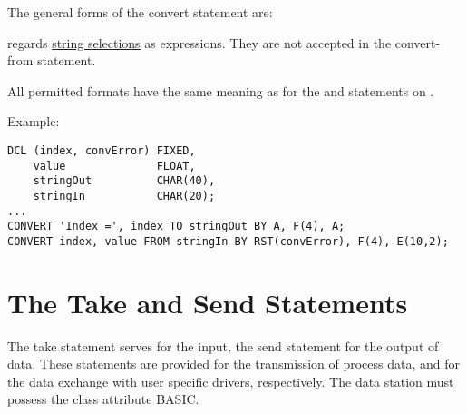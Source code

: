 The general forms of the convert statement are:

\begin{grammarframe}





\end{grammarframe}

\OpenPEARL{} regards \hyperlink{StringSelection}{string selections} as
expressions. They are not accepted in the convert-from statement.

All permitted formats have the same meaning as for the  and 
statements 
on  .

Example:

\begin{lstlisting}
DCL (index, convError) FIXED,
    value              FLOAT,
    stringOut          CHAR(40),
    stringIn           CHAR(20);
...
CONVERT 'Index =', index TO stringOut BY A, F(4), A;
CONVERT index, value FROM stringIn BY RST(convError), F(4), E(10,2);
\end{lstlisting}

\section{The Take and Send Statements}    %
\label{sec_take_send}

The take statement serves for the input, the send statement for the
output of data. These statements are provided for the transmission of
process data, and for the data exchange with user specific drivers,
respectively. The data station must possess the class attribute BASIC.

\begin{grammarframe}



\end{grammarframe}

